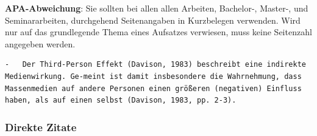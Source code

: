 \documentclass[
  letterpaper,
  DIV=11]{scrreprt}
\begin{document}
\begin{tcolorbox}[enhanced jigsaw, left=2mm, rightrule=.15mm, bottomrule=.15mm, bottomtitle=1mm, colback=white, leftrule=.75mm, breakable, titlerule=0mm, toptitle=1mm, opacityback=0, opacitybacktitle=0.6, colbacktitle=quarto-callout-important-color!10!white, colframe=quarto-callout-important-color-frame, arc=.35mm, toprule=.15mm, coltitle=black, title=\textcolor{quarto-callout-important-color}{\faExclamation}\hspace{0.5em}{Wichtig}]

\textbf{APA-Abweichung}: Sie sollten bei allen allen Arbeiten,
Bachelor-, Master-, und Seminararbeiten, durchgehend Seitenangaben in
Kurzbelegen verwenden. Wird nur auf das grundlegende Thema eines
Aufsatzes verwiesen, muss keine Seitenzahl angegeben werden.

\end{tcolorbox}

\begin{verbatim}
-   Der Third-Person Effekt (Davison, 1983) beschreibt eine indirekte Medienwirkung. Ge-meint ist damit insbesondere die Wahrnehmung, dass Massenmedien auf andere Personen einen größeren (negativen) Einfluss haben, als auf einen selbst (Davison, 1983, pp. 2-3).
\end{verbatim}

\subsubsection{Direkte Zitate}\label{direkte-zitate}
\end{document}
